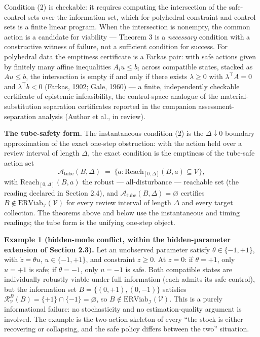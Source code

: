 \documentclass[11pt]{article}
\begin{document}
Condition (2) is checkable: it requires computing the intersection of
the safe-control sets over the information set, which for polyhedral
constraint and control sets is a finite linear program. When the
intersection is nonempty, the common action is a candidate for viability
--- Theorem 3 is a \emph{necessary} condition with a constructive
witness of failure, not a sufficient condition for success. For
polyhedral data the emptiness certificate is a Farkas pair: with safe
actions given by finitely many affine inequalities \(A_i u \le b_i\)
across compatible states, stacked as \(A u \le b\), the intersection is
empty if and only if there exists \(\lambda \ge 0\) with
\(\lambda^{\top} A = 0\) and \(\lambda^{\top} b < 0\) (Farkas, 1902;
Gale, 1960) --- a finite, independently checkable certificate of
epistemic infeasibility, the control-space analogue of the
material-substitution separation certificates reported in the companion
assessment-separation analysis (Author et al., in review).

\textbf{The tube-safety form.} The instantaneous condition (2) is the
\(\Delta \downarrow 0\) boundary approximation of the exact one-step
obstruction: with the action held over a review interval of length
\(\Delta\), the exact condition is the emptiness of the tube-safe action
set
\[\mathcal{A}_{\mathrm{tube}}(B, \Delta) \;=\; \Big\{ a : \mathrm{Reach}_{[0,\Delta]}(B, a) \subseteq \mathcal{V} \Big\},\]
with \(\mathrm{Reach}_{[0,\Delta]}(B, a)\) the robust ---
all-disturbance --- reachable set (the reading declared in Section 2.4),
and \(\mathcal{A}_{\mathrm{tube}}(B, \Delta) = \varnothing\) certifies
\(B \notin \mathrm{ERViab}_{\mathcal{I}}(\mathcal{V})\) for every review
interval of length \(\Delta\) and every target collection. The theorems
above and below use the instantaneous and timing readings; the tube form
is the unifying one-step object.

\textbf{Example 1 (hidden-mode conflict, within the hidden-parameter
extension of Section 2.3).} Let an unobserved parameter satisfy
\(\theta \in \{-1, +1\}\), with \(\dot z = \theta u\),
\(u \in \{-1, +1\}\), and constraint \(z \ge 0\). At \(z = 0\): if
\(\theta = +1\), only \(u = +1\) is safe; if \(\theta = -1\), only
\(u = -1\) is safe. Both compatible states are individually robustly
viable under full information (each admits its safe control), but the
information set \(B = \{(0, +1), (0, -1)\}\) satisfies
\(\mathcal{R}_{\mathcal{V}}^B(B) = \{+1\} \cap \{-1\} = \varnothing\),
so \(B \notin \mathrm{ERViab}_{\mathcal{I}}(\mathcal{V})\). This is a
purely informational failure: no stochasticity and no estimation-quality
argument is involved. The example is the two-action skeleton of every
``the stock is either recovering or collapsing, and the safe policy
differs between the two'' situation.
\end{document}
